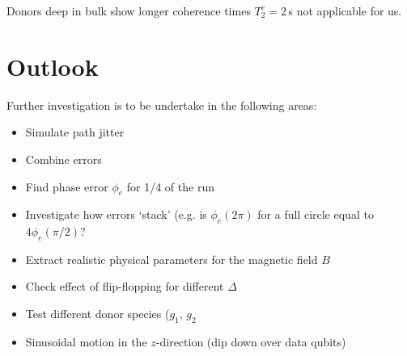 Donors deep in bulk show longer coherence times $T_2^e=2\, $s \cite{Tyryshkin2011} not applicable for us.


\section{Outlook}
Further investigation is to be undertake in the following areas:

\begin{itemize}
\item Simulate path jitter
\item Combine errors
\item Find phase error $\phi_e$ for 1/4 of the run
\item Investigate how errors `stack' (e.g. is $\phi_e(2\pi)$ for a full circle equal to $4\phi_e(\pi/2)$?
\item Extract realistic physical parameters for the magnetic field $B$
\item Check effect of flip-flopping for different $\Delta$
\item Test different donor species ($g_1$, $g_2$
\item Sinusoidal motion in the $z$-direction (dip down over data qubits)
\end{itemize}







